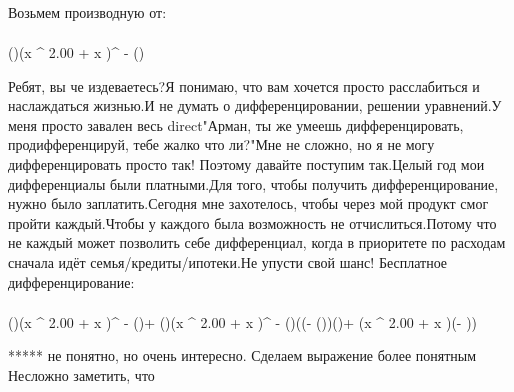 Возьмем производную от:
\begin{gather}
\end{gather}
\begin{}
()\cdot (x ^ {2.00 }+ \sin x )^ {- \arcsin ()}\\
\end{}
Ребят, вы че издеваетесь?Я понимаю, что вам хочется просто расслабиться и наслаждаться жизнью.И не думать о дифференцировании, решении уравнений.У меня просто завален весь direct"Арман, ты же умеешь дифференцировать, продифференцируй, тебе жалко что ли?"Мне не сложно, но я не могу дифференцировать просто так! Поэтому давайте поступим так.Целый год мои дифференциалы были платными.Для того, чтобы получить дифференцирование, нужно было заплатить.Сегодня мне захотелось, чтобы через мой продукт смог пройти каждый.Чтобы у каждого была возможность не отчислиться.Потому что не каждый может позволить себе дифференциал, когда в приоритете по расходам сначала идёт семья/кредиты/ипотеки.Не упусти свой шанс! Бесплатное дифференцирование: 
\begin{gather}
\end{gather}
\begin{}
()\cdot (x ^ {2.00 }+ \sin x )^ {- \arcsin ()}+ ()\cdot (x ^ {2.00 }+ \sin x )^ {- \arcsin ()}\cdot ((- \arcsin ())\cdot ()+ \ln (x ^ {2.00 }+ \sin x )\cdot (- ))\\
\end{}
***** не понятно, но очень интересно. Сделаем выражение более понятным
Несложно заметить, что
\begin{gather}
\end{gather}
